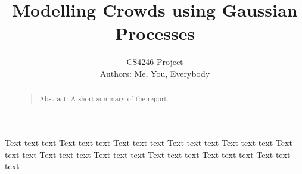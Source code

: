\documentclass[letterpaper]{article}
\begin{document}
% 
\title{Modelling Crowds using Gaussian Processes}
\author{CS4246 Project\\
Authors: Me, You, Everybody
}
\maketitle
\begin{abstract}
\begin{quote}
Abstract: A short summary of the report.
\end{quote}
\end{abstract}

Text text text
Text text text
Text text text
Text text text
Text text text
Text text text
Text text text
Text text text
Text text text
Text text text
Text text text
\end{document}
